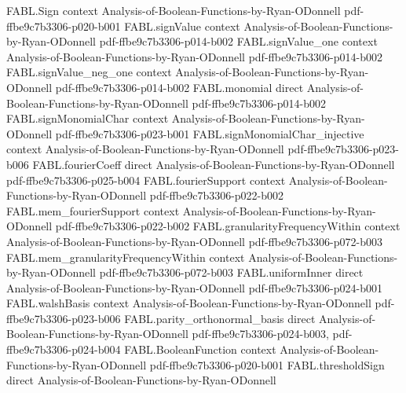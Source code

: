 \begin{theorem}
\label{FABL.exists_rankingPreference_eq_iff_isNAE3}
\leanok
{}
\proofstep
  {FABL.Sign}
  {context}
  {Analysis-of-Boolean-Functions-by-Ryan-ODonnell}
  {pdf-ffbe9c7b3306-p020-b001}
\proofstep
  {FABL.signValue}
  {context}
  {Analysis-of-Boolean-Functions-by-Ryan-ODonnell}
  {pdf-ffbe9c7b3306-p014-b002}
\proofstep
  {FABL.signValue_one}
  {context}
  {Analysis-of-Boolean-Functions-by-Ryan-ODonnell}
  {pdf-ffbe9c7b3306-p014-b002}
\proofstep
  {FABL.signValue_neg_one}
  {context}
  {Analysis-of-Boolean-Functions-by-Ryan-ODonnell}
  {pdf-ffbe9c7b3306-p014-b002}
\proofstep
  {FABL.monomial}
  {direct}
  {Analysis-of-Boolean-Functions-by-Ryan-ODonnell}
  {pdf-ffbe9c7b3306-p014-b002}
\proofstep
  {FABL.signMonomialChar}
  {context}
  {Analysis-of-Boolean-Functions-by-Ryan-ODonnell}
  {pdf-ffbe9c7b3306-p023-b001}
\proofstep
  {FABL.signMonomialChar_injective}
  {context}
  {Analysis-of-Boolean-Functions-by-Ryan-ODonnell}
  {pdf-ffbe9c7b3306-p023-b006}
\proofstep
  {FABL.fourierCoeff}
  {direct}
  {Analysis-of-Boolean-Functions-by-Ryan-ODonnell}
  {pdf-ffbe9c7b3306-p025-b004}
\proofstep
  {FABL.fourierSupport}
  {context}
  {Analysis-of-Boolean-Functions-by-Ryan-ODonnell}
  {pdf-ffbe9c7b3306-p022-b002}
\proofstep
  {FABL.mem_fourierSupport}
  {context}
  {Analysis-of-Boolean-Functions-by-Ryan-ODonnell}
  {pdf-ffbe9c7b3306-p022-b002}
\proofstep
  {FABL.granularityFrequencyWithin}
  {context}
  {Analysis-of-Boolean-Functions-by-Ryan-ODonnell}
  {pdf-ffbe9c7b3306-p072-b003}
\proofstep
  {FABL.mem_granularityFrequencyWithin}
  {context}
  {Analysis-of-Boolean-Functions-by-Ryan-ODonnell}
  {pdf-ffbe9c7b3306-p072-b003}
\proofstep
  {FABL.uniformInner}
  {direct}
  {Analysis-of-Boolean-Functions-by-Ryan-ODonnell}
  {pdf-ffbe9c7b3306-p024-b001}
\proofstep
  {FABL.walshBasis}
  {context}
  {Analysis-of-Boolean-Functions-by-Ryan-ODonnell}
  {pdf-ffbe9c7b3306-p023-b006}
\proofstep
  {FABL.parity_orthonormal_basis}
  {direct}
  {Analysis-of-Boolean-Functions-by-Ryan-ODonnell}
  {pdf-ffbe9c7b3306-p024-b003,
    pdf-ffbe9c7b3306-p024-b004}
\proofstep
  {FABL.BooleanFunction}
  {context}
  {Analysis-of-Boolean-Functions-by-Ryan-ODonnell}
  {pdf-ffbe9c7b3306-p020-b001}
\proofstep
  {FABL.thresholdSign}
  {direct}
  {Analysis-of-Boolean-Functions-by-Ryan-ODonnell}

\end{theorem}
